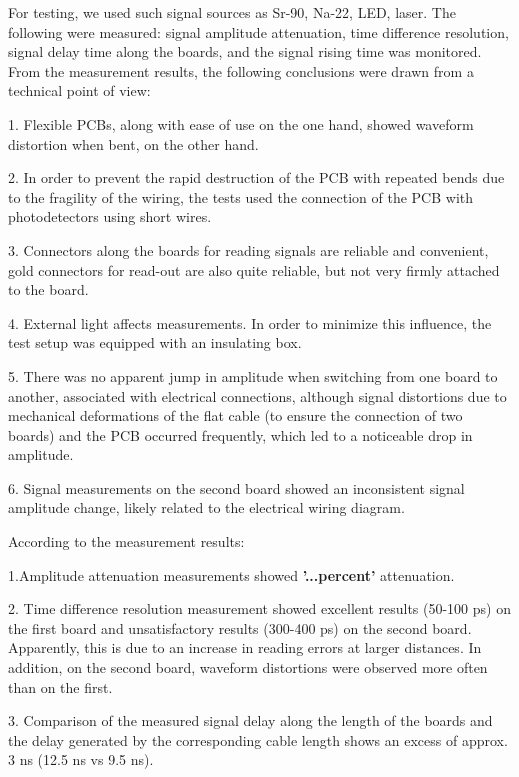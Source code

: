 \documentclass{article}
\begin{document}
 

For testing, we used such signal sources as Sr-90, Na-22, LED, laser.
The following were measured: signal amplitude attenuation, time difference resolution, signal delay time along the boards, and the signal rising time was monitored.
From the measurement results, the following conclusions were drawn from a technical point of view:

1. Flexible PCBs, along with ease of use on the one hand, showed waveform distortion when bent, on the other hand.

2. In order to prevent the rapid destruction of the PCB with repeated bends due to the fragility of the wiring, the tests used the connection of the PCB with photodetectors using short wires.

3. Connectors along the boards for reading signals are reliable and convenient, gold connectors for read-out are also quite reliable, but not very firmly attached to the board.

4. External light affects measurements. In order to minimize this influence, the test setup was equipped with an insulating box.

5. There was no apparent jump in amplitude when switching from one board to another, associated with electrical connections, although signal distortions due to mechanical deformations of the flat cable (to ensure the connection of two boards) and the PCB occurred frequently, which led to a noticeable drop in amplitude.

6. Signal measurements on the second board showed an inconsistent signal amplitude change, likely related to the electrical wiring diagram.

According to the measurement results:

1.Amplitude attenuation measurements showed \textbf{'...percent'} attenuation.

2. Time difference resolution measurement showed excellent results (50-100 ps) on the first board and unsatisfactory results       (300-400 ps) on the second board. Apparently, this is due to an increase in reading errors at larger distances. In addition, on the second board, waveform distortions were observed more often than on the first. 

3. Comparison of the measured signal delay along the length of the boards and the delay generated by the corresponding cable length shows an excess of approx. 3 ns (12.5 ns vs 9.5 ns).
\end{document}
